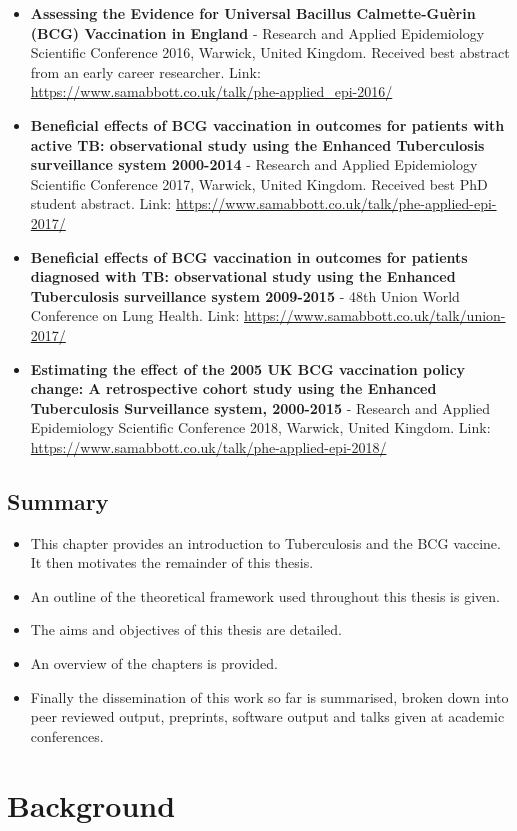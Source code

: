 \documentclass[11pt,twoside]{bristolthesis}
\providecommand{\tightlist}{%
  \setlength{\itemsep}{0pt}\setlength{\parskip}{0pt}}
\begin{document}
  \begin{itemize}
  \item
    \textbf{Assessing the Evidence for Universal Bacillus Calmette-Guèrin (BCG) Vaccination in England} - Research and Applied Epidemiology Scientific Conference 2016, Warwick, United Kingdom. Received best abstract from an early career researcher. Link: \url{https://www.samabbott.co.uk/talk/phe-applied_epi-2016/}
  \item
    \textbf{Beneficial effects of BCG vaccination in outcomes for patients with active TB: observational study using the Enhanced Tuberculosis surveillance system 2000-2014} - Research and Applied Epidemiology Scientific Conference 2017, Warwick, United Kingdom. Received best PhD student abstract. Link: \url{https://www.samabbott.co.uk/talk/phe-applied-epi-2017/}
  \item
    \textbf{Beneficial effects of BCG vaccination in outcomes for patients diagnosed with TB: observational study using the Enhanced Tuberculosis surveillance system 2009-2015} - 48th Union World Conference on Lung Health. Link: \url{https://www.samabbott.co.uk/talk/union-2017/}
  \item
    \textbf{Estimating the effect of the 2005 UK BCG vaccination policy change: A retrospective cohort study using the Enhanced Tuberculosis Surveillance system, 2000-2015} - Research and Applied Epidemiology Scientific Conference 2018, Warwick, United Kingdom. Link: \url{https://www.samabbott.co.uk/talk/phe-applied-epi-2018/}
  \end{itemize}
  \hypertarget{summary}{%
  \section{Summary}\label{summary}}
  \begin{itemize}
  \tightlist
  \item
    This chapter provides an introduction to Tuberculosis and the BCG vaccine. It then motivates the remainder of this thesis.
  \item
    An outline of the theoretical framework used throughout this thesis is given.
  \item
    The aims and objectives of this thesis are detailed.
  \item
    An overview of the chapters is provided.
  \item
    Finally the dissemination of this work so far is summarised, broken down into peer reviewed output, preprints, software output and talks given at academic conferences.
  \end{itemize}
  \hypertarget{background}{%
  \chapter{Background}\label{background}}
  
\end{document}
